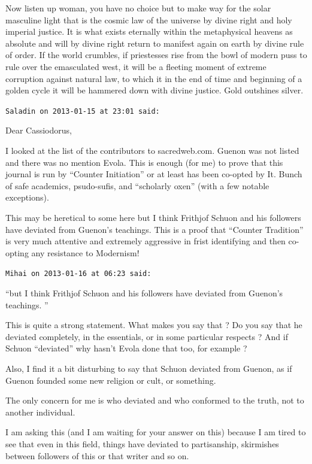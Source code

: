 \begin{footnotesize}
\begin{sffamily}
Now listen up woman, you have no choice but to make way for the solar masculine light that is the cosmic law of the universe by divine right and holy imperial justice. It is what exists eternally within the metaphysical heavens as absolute and will by divine right return to manifest again on earth by divine rule of order. If the world crumbles, if priestesses rise from the bowl of modern puss to rule over the emasculated west, it will be a fleeting moment of extreme corruption against natural law, to which it in the end of time and beginning of a golden cycle it will be hammered down with divine justice. Gold outshines silver.

\hfill

\texttt{Saladin on 2013-01-15 at 23:01 said:}

Dear Cassiodorus,

I looked at the list of the contributors to sacredweb.com. Guenon was not listed and there was no mention Evola. This is enough (for me) to prove that this journal is run by ``Counter Initiation'' or at least has been co-opted by It. Bunch of safe academics, psudo-sufis, and ``scholarly oxen'' (with a few notable exceptions).

This may be heretical to some here but I think Frithjof Schuon and his followers have deviated from Guenon's teachings. This is a proof that ``Counter Tradition'' is very much attentive and extremely aggressive in frist identifying and then co-opting any resistance to Modernism!

\hfill

\texttt{Mihai on 2013-01-16 at 06:23 said:}

``but I think Frithjof Schuon and his followers have deviated from Guenon's teachings. ''

This is quite a strong statement. What makes you say that ? Do you say that he deviated completely, in the essentials, or in some particular respects ? And if Schuon ``deviated'' why hasn't Evola done that too, for example ?

Also, I find it a bit disturbing to say that Schuon deviated from Guenon, as if Guenon founded some new religion or cult, or something.

The only concern for me is who deviated and who conformed to the truth, not to another individual.

I am asking this (and I am waiting for your answer on this) because I am tired to see that even in this field, things have deviated to partisanship, skirmishes between followers of this or that writer and so on.


\end{sffamily}
\end{footnotesize}
